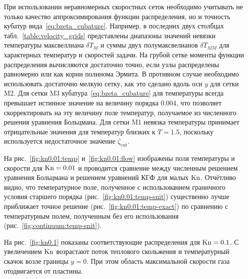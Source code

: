 При использовании неравномерных скоростных сеток необходимо учитывать не только качество аппроксимирования
функции распределения, но и точность кубатур вида~\eqref{eq:bzeta_cubature}.
Например, в последних двух столбцах табл.~\ref{table:velocity_grids} представлены диапазоны значений
невязки температуры максвеллиана \(\delta T_M\) и суммы двух полумаксвелианов \(\delta T_{MM}\)
для характерных температур и скоростей задачи.
На грубой сетке моменты функции распределения вычисляются достаточно точно,
если узлы распределены равномерно или как корни полинома Эрмита.
В противном случае необходимо использовать достаточно мелкую сетку,
как это сделано вдоль оси \(y\) для сетки M2.
Для сетки M3 кубатура~\eqref{eq:bzeta_cubature} для температуры всегда превышает истинное значение
на величину порядка \(0.004\), что позволяет скорректировать на эту величину поле температур,
получаемое из численного решения уравнения Больцмана.
Для сетки M1 невязка температуры принимает отрицательные значения для температур близких к \(T=1.5\),
поскольку используется недостаточное значение \(\zeta_{\mathrm{cut}}\).

На рис.~\ref{fig:kn0.01:temp} и~\ref{fig:kn0.01:flow} изображены поля температуры и скорости
для \(\mathrm{Kn}=0.01\) и проводится сравнение между численным решением уравнения Больцмана
и решением уравнений КГФ для малых \(\mathrm{Kn}\).
Отчётливо видно, что температурное поле, полученное с использованием
граничного условия старшего порядка (рис.~\ref{fig:kn0.01:temp-snit})
существенно лучше приближает точное решение (рис.~\ref{fig:kn0.01:temp-exact})
по сравнению с температурным полем, полученным без его использования (рис.~\ref{fig:continuum:temp-snit}).

На рис.~\ref{fig:kn0.1} показаны соответствующие распределения для \(\mathrm{Kn}=0.1\).
С увеличением \(\mathrm{Kn}\) возрастают поток теплового скольжения и температурный скачок возле границы \(y=0\).
При этом область максимальной скорости газа отодвигается от пластины.

